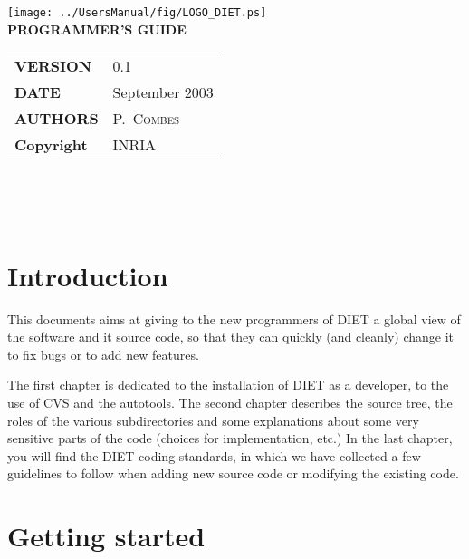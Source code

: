 \documentclass[11pt,a4paper]{report}
\begin{document}

\thispagestyle{empty}
\vspace*{3cm}
\vspace*{3cm}

\begin{center}
\texttt{[image: ../UsersManual/fig/LOGO\_DIET.ps]}\\[2ex]
\textbf{\Huge PROGRAMMER'S GUIDE\\[2ex]}
\end{center}

\vfill

\noindent
\small{
\begin{tabular}{ll}
  \textbf{VERSION}  & 0.1\\
  \textbf{DATE}     & September 2003\\
  \textbf{AUTHORS}  & P.~\textsc{Combes}\\
  \textbf{Copyright}& INRIA
\end{tabular}\\
}

\newpage
\thispagestyle{empty}
\ 



\newpage
\tableofcontents


%
%
\newpage
{}
\chapter*{Introduction}

This documents aims at giving to the new programmers of DIET a global view of the
software and it source code, so that they can quickly (and cleanly) change it to
fix bugs or to add new features.

The first chapter is dedicated to the installation of DIET as a developer, to
the use of CVS and the autotools.
The second chapter describes the source tree, the roles of the various
subdirectories and some explanations about some very sensitive parts of the code
(choices for implementation, etc.)
In the last chapter, you will find the DIET coding standards, in which we have
collected a few guidelines to follow when adding new source code or modifying
the existing code.


%
%
\chapter{Getting started}
\end{document}
